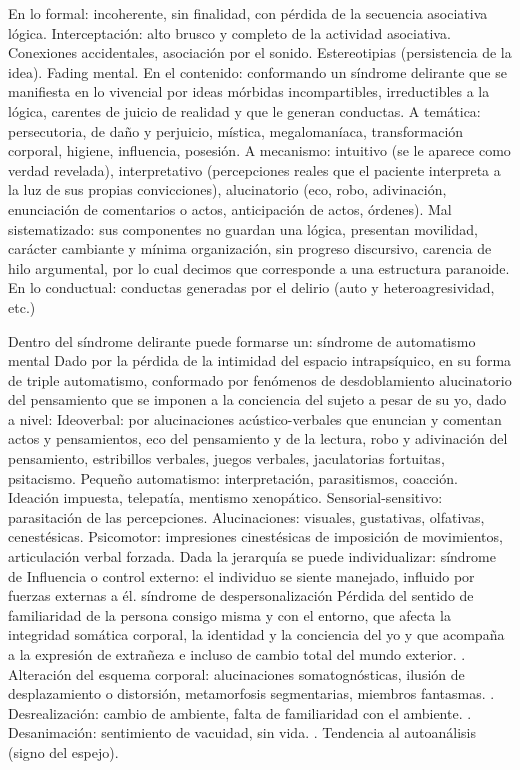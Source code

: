 \documentclass{scrbook}
\begin{document}
En lo formal: incoherente, sin finalidad, con pérdida de la secuencia asociativa lógica. Interceptación: alto brusco y completo de la actividad asociativa. Conexiones accidentales, asociación por el sonido. Estereotipias (persistencia de la idea). Fading mental. 
En el contenido: conformando un síndrome delirante que se manifiesta en lo vivencial por ideas mórbidas incompartibles, irreductibles a la lógica, carentes de juicio de realidad y que le generan conductas. 
A temática: persecutoria, de daño y perjuicio, mística, megalomaníaca, transformación corporal, higiene, influencia, posesión. 
A mecanismo: intuitivo (se le aparece como verdad revelada), interpretativo (percepciones reales que el paciente interpreta a la luz de sus propias convicciones), alucinatorio (eco, robo, adivinación, enunciación de comentarios o actos, anticipación de actos, órdenes). Mal sistematizado: sus componentes no guardan una lógica, presentan movilidad, carácter cambiante y mínima organización, sin progreso discursivo, carencia de hilo argumental, por lo cual decimos que corresponde a una estructura paranoide. En lo conductual: conductas generadas por el delirio (auto y heteroagresividad, etc.) 

Dentro del síndrome delirante puede formarse un: síndrome de automatismo mental Dado por la pérdida de la intimidad del espacio intrapsíquico, en su forma de triple automatismo, conformado por fenómenos de desdoblamiento alucinatorio del pensamiento que se imponen a la conciencia del sujeto a pesar de su yo, dado a nivel: Ideoverbal: por alucinaciones acústico-verbales que enuncian y comentan actos y pensamientos, eco del pensamiento y de la lectura, robo y adivinación del pensamiento, estribillos verbales, juegos verbales, jaculatorias fortuitas, psitacismo. Pequeño automatismo: interpretación, parasitismos, coacción. Ideación impuesta, telepatía, mentismo xenopático. Sensorial-sensitivo: parasitación de las percepciones. Alucinaciones: visuales, gustativas, olfativas, cenestésicas. Psicomotor: impresiones cinestésicas de imposición de movimientos, articulación verbal forzada. Dada la jerarquía se puede individualizar: síndrome de Influencia o control externo: el individuo se siente manejado, influido por fuerzas externas a él. síndrome de despersonalización Pérdida del sentido de familiaridad de la persona consigo misma y con el entorno, que afecta la integridad somática corporal, la identidad y la conciencia del yo y que acompaña a la expresión de extrañeza e incluso de cambio total del mundo exterior. . Alteración del esquema corporal: alucinaciones somatognósticas, ilusión de desplazamiento o distorsión, metamorfosis segmentarias, miembros fantasmas. . Desrealización: cambio de ambiente, falta de familiaridad con el ambiente. . Desanimación: sentimiento de vacuidad, sin vida. . Tendencia al autoanálisis (signo del espejo). 
\end{document}
